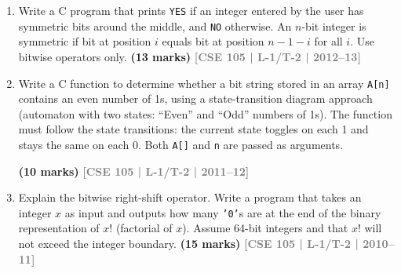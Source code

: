\documentclass[12pt,a3paper]{article}
\newcommand{\yr}[1]{\hfill\textcolor{gray}{\small\textbf{[#1]}}}
\newcommand{\mk}[1]{\textcolor{orange!70!black}{\small\textbf{(#1 marks)}}}
\begin{document}
\begin{enumerate}
\item Write a C program that prints \texttt{YES} if an integer entered by the user has symmetric bits around the middle, and \texttt{NO} otherwise. An $n$-bit integer is symmetric if bit at position $i$ equals bit at position $n-1-i$ for all $i$. Use bitwise operators only.
\mk{13} \yr{CSE 105 | L-1/T-2 | 2012--13}

\item Write a C function to determine whether a bit string stored in an array \texttt{A[n]} contains an even number of 1s, using a state-transition diagram approach (automaton with two states: ``Even'' and ``Odd'' numbers of 1s). The function must follow the state transitions: the current state toggles on each 1 and stays the same on each 0. Both \texttt{A[]} and \texttt{n} are passed as arguments.
\begin{center}
\end{center}
\mk{10} \yr{CSE 105 | L-1/T-2 | 2011--12}


\item Explain the bitwise right-shift operator. Write a program that takes an integer $x$ as input and outputs how many \texttt{'0'}s are at the end of the binary representation of $x!$ (factorial of $x$). Assume 64-bit integers and that $x!$ will not exceed the integer boundary.
\mk{15} \yr{CSE 105 | L-1/T-2 | 2010--11}


\end{enumerate}
\end{document}
